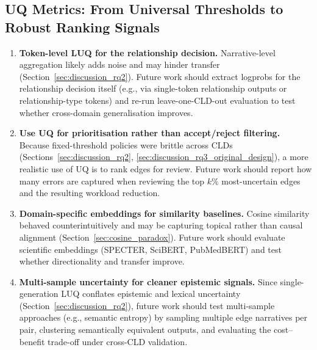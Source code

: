 \subsection{UQ Metrics: From Universal Thresholds to Robust Ranking Signals}
\begin{enumerate}[noitemsep]
    \item \textbf{Token-level LUQ for the relationship decision.} Narrative-level aggregation likely adds noise and may hinder transfer (Section~\ref{sec:discussion_rq2}). Future work should extract logprobs for the relationship decision itself (e.g., via single-token relationship outputs or relationship-type tokens) and re-run leave-one-CLD-out evaluation to test whether cross-domain generalisation improves.
    \item \textbf{Use UQ for prioritisation rather than accept/reject filtering.} Because fixed-threshold policies were brittle across CLDs (Sections~\ref{sec:discussion_rq2}, \ref{sec:discussion_rq3_original_design}), a more realistic use of UQ is to rank edges for review. Future work should report how many errors are captured when reviewing the top $k\%$ most-uncertain edges and the resulting workload reduction.
    \item \textbf{Domain-specific embeddings for similarity baselines.} Cosine similarity behaved counterintuitively and may be capturing topical rather than causal alignment (Section~\ref{sec:cosine_paradox}). Future work should evaluate scientific embeddings (SPECTER, SciBERT, PubMedBERT) and test whether directionality and transfer improve.
    \item \textbf{Multi-sample uncertainty for cleaner epistemic signals.} Since single-generation LUQ conflates epistemic and lexical uncertainty (Section~\ref{sec:discussion_rq2}), future work should test multi-sample approaches (e.g., semantic entropy) by sampling multiple edge narratives per pair, clustering semantically equivalent outputs, and evaluating the cost--benefit trade-off under cross-CLD validation.
\end{enumerate}

